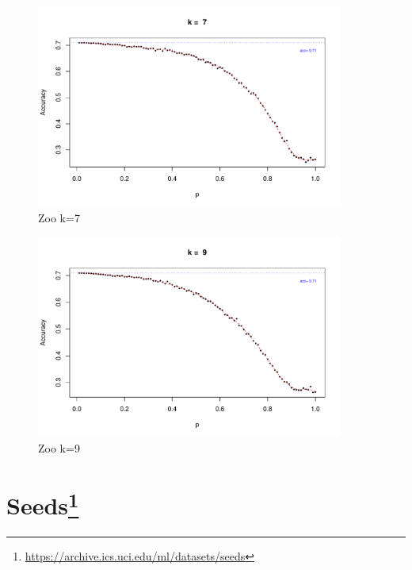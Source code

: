 \documentclass{article}
\begin{document}
\begin{figure}
 \centering
 \includegraphics[width=0.9\textwidth]{./figures/Zoo_k7.pdf}
 \caption{Zoo k=7}
 \label{fig:Zoo7}
\end{figure}
\begin{figure}
 \centering
 \includegraphics[width=0.9\textwidth]{./figures/Zoo_k9.pdf}
 \caption{Zoo k=9}
 \label{fig:Zoo9}
\end{figure}

\FloatBarrier
\section[Seeds]{Seeds\footnote{\url{https://archive.ics.uci.edu/ml/datasets/seeds}}}
\end{document}
